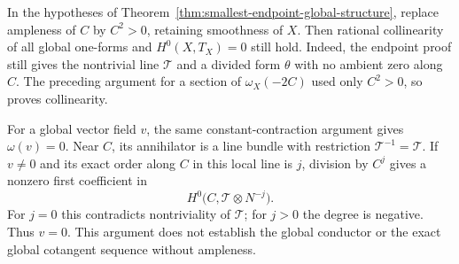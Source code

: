 \begin{remark}
\label{rem:smallest-endpoint-positive-square-forms}
In the hypotheses of
Theorem~\ref{thm:smallest-endpoint-global-structure}, replace
ampleness of $C$ by $C^2>0$, retaining smoothness of $X$.
Then rational collinearity of all global one-forms and
$H^0(X,T_X)=0$ still hold.
Indeed, the endpoint proof still gives the nontrivial line
$\mathcal T$ and a divided form $\theta$ with no ambient zero
along $C$.  The preceding argument for a section of
$\omega_X(-2C)$ used only $C^2>0$, so proves collinearity.

For a global vector field $v$, the same constant-contraction
argument gives $\omega(v)=0$.  Near $C$, its annihilator is a
line bundle with restriction $\mathcal T^{-1}=\mathcal T$.
If $v\ne0$ and its exact order along $C$ in this local line is $j$,
division by $C^j$ gives a nonzero first coefficient in
\[
 H^0\bigl(C,\mathcal T\otimes N^{-j}\bigr).
\]
For $j=0$ this contradicts nontriviality of $\mathcal T$;
for $j>0$ the degree is negative.
Thus $v=0$.  This argument does not establish the global conductor
or the exact global cotangent sequence without ampleness.
\end{remark}
